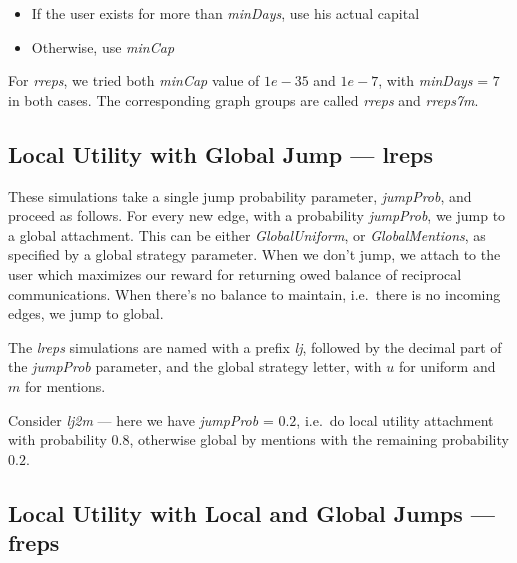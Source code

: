 \documentclass[10pt,oneside]{memoir}
\begin{document}
\begin{itemize}


\item If the user exists for more than {\itshape minDays}, use his actual capital

\item Otherwise, use {\itshape minCap}
\end{itemize}

For {\itshape rreps}, we tried both {\itshape minCap} value of $1e-35$ and $1e-7$, with {\itshape minDays} = $7$ in both cases.  The corresponding graph groups are called {\itshape rreps} and {\itshape rreps7m}.


\subsection{Local Utility with Global Jump --- lreps}
\label{localutilitywithglobaljumplreps}

These simulations take a single jump probability parameter, {\itshape jumpProb}, and proceed as follows.  For every new edge, with a probability {\itshape jumpProb}, we jump to a global attachment.  This can be either {\itshape GlobalUniform}, or {\itshape GlobalMentions}, as specified by a global strategy parameter.  When we don't jump, we attach to the user which maximizes our reward for returning owed balance of reciprocal communications.  When there's no balance to maintain, i.e.\ there is no incoming edges, we jump to global.


The {\itshape lreps} simulations are named with a prefix {\itshape lj}, followed by the decimal part of the {\itshape jumpProb} parameter, and the global strategy letter, with $u$ for uniform and $m$ for mentions.


Consider {\itshape lj2m} --- here we have {\itshape jumpProb} = $0.2$, i.e.\ do local utility attachment with probability $0.8$, otherwise global by mentions with the remaining probability $0.2$.


\subsection{Local Utility with Local and Global Jumps --- freps}
\label{localutilitywithlocalandglobaljumpsfreps}
\end{document}
